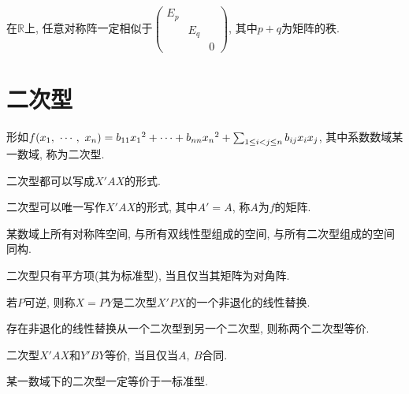\begin{inference}
    在$\mathbb{R}$上, 任意对称阵一定相似于$\begin{pmatrix}
        E_p &     &\\
            & E_q &\\
            &     &0
    \end{pmatrix}$, 其中$p+q$为矩阵的秩.
\end{inference}

\section{ 二次型 }

\begin{definition}[二次型]
    形如$f({x}{_1},\ \cdots,\ {x}{_{n}})=b_{11}{x_1}^2+\cdots+b_{nn}{x_n}^2+\sum_{1\le i<j \le n}b_{ij}x_ix_j$, 其中系数数域某一数域, 称为二次型.\par
    二次型都可以写成$X'AX$的形式.
\end{definition}

\begin{lemma}
    二次型可以唯一写作$X'AX$的形式, 其中$A'=A$, 称$A$为$f$的矩阵.
\end{lemma}

\begin{example}
    某数域上所有对称阵空间, 与所有双线性型组成的空间, 与所有二次型组成的空间同构.
\end{example}

\begin{definition}[二次型的标准型]
    二次型只有平方项(其为标准型), 当且仅当其矩阵为对角阵.
\end{definition}

\begin{definition}[非退化的线性替换]
    若$P$可逆, 则称$X=PY$是二次型$X'PX$的一个非退化的线性替换.
\end{definition}

\begin{definition}[二次型的等价]
    存在非退化的线性替换从一个二次型到另一个二次型, 则称两个二次型等价.
\end{definition}

\begin{inference}
    二次型$X'AX$和$Y'BY$等价, 当且仅当$A,\ B$合同.
\end{inference}

\begin{inference}
    某一数域下的二次型一定等价于一标准型.
\end{inference}

